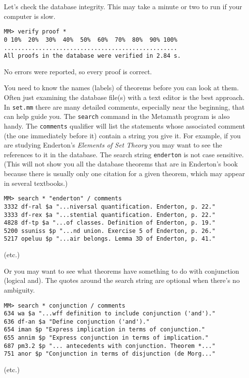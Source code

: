Let's check the database integrity.  This may take a minute or two to run if
your computer is slow.

\begin{verbatim}
MM> verify proof *
0 10%  20%  30%  40%  50%  60%  70%  80%  90% 100%
..................................................
All proofs in the database were verified in 2.84 s.
\end{verbatim}

No errors were reported, so every proof is correct.

You need to know the names (labels) of theorems before you can look at them.
Often just examining the database file(s) with a text editor is the best
approach.  In \texttt{set.mm} there are many detailed comments, especially near
the beginning, that can help guide you. The \texttt{search} command in the
Metamath program is also handy.  The \texttt{comments} qualifier will list the
statements whose associated comment (the one immediately before it) contain a
string you give it.  For example, if you are studying Enderton's {\em Elements
of Set Theory} \cite{Enderton} you may want to see
the references to it in the database.  The search string \texttt{enderton} is not
case sensitive.  (This will not show you all the database theorems that are in
Enderton's book because there is usually only one citation for a given
theorem, which may appear in several textbooks.)

\begin{verbatim}
MM> search * "enderton" / comments
3332 df-ral $a "...niversal quantification. Enderton, p. 22."
3333 df-rex $a "...stential quantification. Enderton, p. 22."
4828 df-tp $a "...of classes. Definition of Enderton, p. 19."
5200 ssuniss $p "...nd union. Exercise 5 of Enderton, p. 26."
5217 opeluu $p "...air belongs. Lemma 3D of Enderton, p. 41."
\end{verbatim}
\begin{center}
(etc.)
\end{center}

Or you may want to see what theorems have something to do with
conjunction (logical {\sc and}).  The quotes around the search
string are optional when there's no ambiguity.

\begin{verbatim}
MM> search * conjunction / comments
634 wa $a "...wff definition to include conjunction ('and')."
636 df-an $a "Define conjunction ('and')."
654 iman $p "Express implication in terms of conjunction."
655 annim $p "Express conjunction in terms of implication."
687 pm3.2 $p "... antecedents with conjunction. Theorem *..."
751 anor $p "Conjunction in terms of disjunction (de Morg..."
\end{verbatim}
\begin{center}
(etc.)
\end{center}


